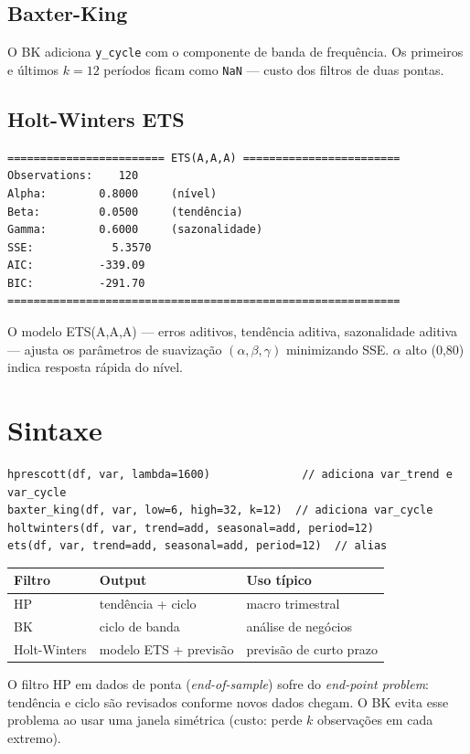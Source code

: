 \subsection*{Baxter-King}

O BK adiciona \texttt{y\_cycle} com o componente de banda de frequência.
Os primeiros e últimos $k = 12$ períodos ficam como \texttt{NaN} — custo
dos filtros de duas pontas.

\subsection*{Holt-Winters ETS}

\begin{lstlisting}[language={}, basicstyle=\ttfamily\small,
  frame=none, numbers=none, backgroundcolor=\color{codbg},
  xleftmargin=0pt, xrightmargin=0pt, breaklines=false]
======================== ETS(A,A,A) ========================
Observations:    120
Alpha:        0.8000     (nível)
Beta:         0.0500     (tendência)
Gamma:        0.6000     (sazonalidade)
SSE:            5.3570
AIC:          -339.09
BIC:          -291.70
============================================================
\end{lstlisting}

O modelo ETS(A,A,A) — erros aditivos, tendência aditiva, sazonalidade
aditiva — ajusta os parâmetros de suavização $(\alpha, \beta, \gamma)$
minimizando SSE. $\alpha$ alto (0{,}80) indica resposta rápida do nível.

\section{Sintaxe}

\begin{lstlisting}
hprescott(df, var, lambda=1600)              // adiciona var_trend e var_cycle
baxter_king(df, var, low=6, high=32, k=12)  // adiciona var_cycle
holtwinters(df, var, trend=add, seasonal=add, period=12)
ets(df, var, trend=add, seasonal=add, period=12)  // alias
\end{lstlisting}

\begin{center}
\begin{tabular}{lll}
\toprule
\textbf{Filtro} & \textbf{Output} & \textbf{Uso típico} \\
\midrule
HP              & tendência + ciclo    & macro trimestral \\
BK              & ciclo de banda       & análise de negócios \\
Holt-Winters    & modelo ETS + previsão & previsão de curto prazo \\
\bottomrule
\end{tabular}
\end{center}

\begin{nota}
  O filtro HP em dados de ponta (\emph{end-of-sample}) sofre do
  \emph{end-point problem}: tendência e ciclo são revisados conforme novos
  dados chegam. O BK evita esse problema ao usar uma janela simétrica
  (custo: perde $k$ observações em cada extremo).
\end{nota}
